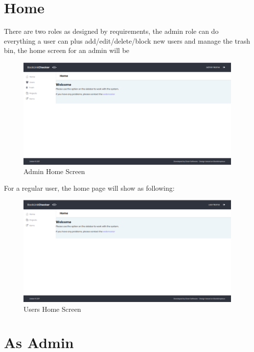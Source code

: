 \section{Home}
There are two roles as designed by requirements, the admin role can do everything a user can plus add/edit/delete/block new users and manage the trash bin, the home screen for an admin will be
\begin{figure}[H]
	\caption{Admin Home Screen}
	\label{img:admin}
	\includegraphics[width=\textwidth]{images/admin_screenshot}
\end{figure}

For a regular user, the home page will show as following:
\begin{figure}[H]
	\caption{Users Home Screen}
	\label{img:usrmng}
	\includegraphics[width=\textwidth]{images/users_home}
\end{figure}

\section{As Admin}
